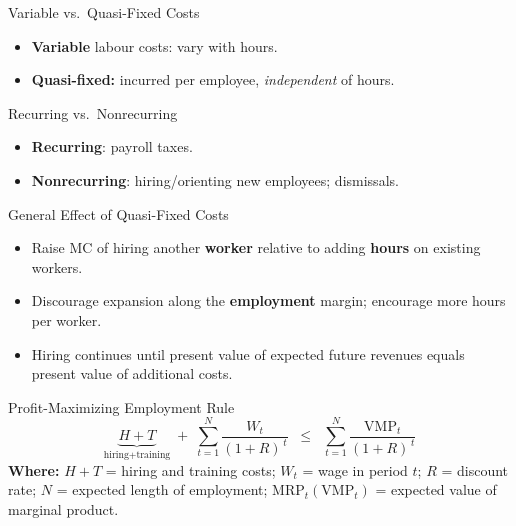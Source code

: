 \documentclass[aspectratio=169]{beamer}
\begin{document}
\begin{frame}{Variable vs.\ Quasi-Fixed Costs}
\transfade
\begin{itemize}[<+->]
  \item \textbf{Variable} labour costs: vary with hours.
  \item \textbf{Quasi-fixed:} incurred per employee, \emph{independent} of hours.
\end{itemize}
\end{frame}

\begin{frame}{Recurring vs.\ Nonrecurring}
\transfade
\begin{itemize}[<+->]
  \item \textbf{Recurring}: payroll taxes.
  \item \textbf{Nonrecurring}: hiring/orienting new employees; dismissals.
\end{itemize}
\end{frame}

\begin{frame}{General Effect of Quasi-Fixed Costs}
\transfade
\begin{itemize}[<+->]
  \item Raise MC of hiring another \textbf{worker} relative to adding \textbf{hours} on existing workers.
  \item Discourage expansion along the \textbf{employment} margin; encourage more hours per worker.
  \item Hiring continues until present value of expected future revenues equals present value of additional costs.
\end{itemize}
\end{frame}

\begin{frame}{Profit-Maximizing Employment Rule}
\transfade
\small
\[
\underbrace{H+T}_{\text{hiring+training}}
\;+\;
\sum_{t=1}^{N}\frac{W_t}{(1+R)^{\,t}}
\;\;\le\;\;
\sum_{t=1}^{N}\frac{\text{VMP}_t}{(1+R)^{\,t}}
\]
\smallskip
\textbf{Where:}\; \(H+T\) = hiring and training costs;\; \(W_t\) = wage in period \(t\);\;
\(R\) = discount rate;\; \(N\) = expected length of employment;\;
\(\text{MRP}_t (\text{VMP}_t)\) = expected value of marginal product.
\end{frame}
\end{document}
